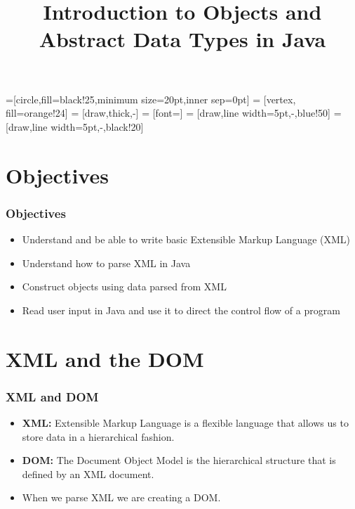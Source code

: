 \documentclass{beamer}
\title{\textbf{Introduction to Objects and Abstract Data Types in Java}}
\date{}
\begin{document}

=[circle,fill=black!25,minimum size=20pt,inner sep=0pt]
 = [vertex, fill=orange!24]
 = [draw,thick,-]
 = [font=\small]
 = [draw,line width=5pt,-,blue!50]
 = [draw,line width=5pt,-,black!20]


\frame{\titlepage}

\section{Objectives}
\begin{frame}
	\frametitle{Objectives}
    \centering
    \begin{itemize}
		\item Understand and be able to write basic Extensible Markup Language (XML)
        \item Understand how to parse XML in Java
        \item Construct objects using data parsed from XML
		\item Read user input in Java and use it to direct the control flow of a program
    \end{itemize}
\end{frame}


\section{XML and the DOM}
\begin{frame}
    \frametitle{XML and DOM}
    \begin{itemize}
        \item \textbf{XML: } Extensible Markup Language is a flexible language that allows us to store data in a hierarchical fashion.
        \item \textbf{DOM: } The Document Object Model is the hierarchical structure that is defined by an XML document.
        \item When we parse XML we are creating a DOM.
    \end{itemize}
\end{frame}
\end{document}
